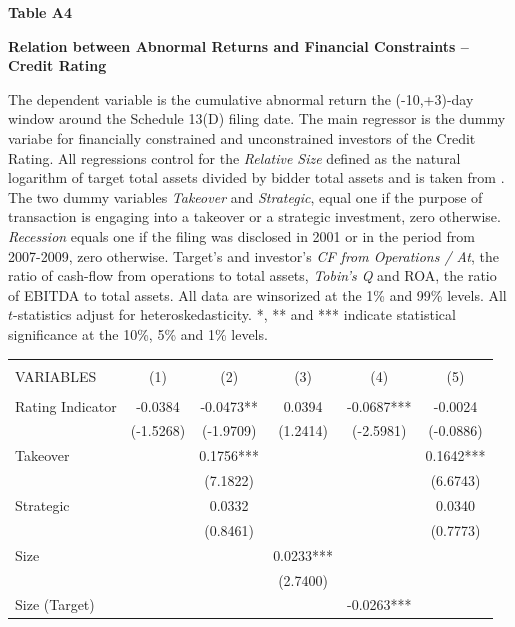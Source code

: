 \documentclass[12pt]{article}
\begin{document}
\begin{appendices}
\begin{table}[!htbp]
	\centering
	\textbf{Table A4}\par\medskip
	\large\textbf{Relation between Abnormal Returns and Financial Constraints -- Credit Rating}\par\medskip
	\justifying
	\footnotesize\noindent{} The dependent variable is the cumulative abnormal return the (-10,+3)-day window around the Schedule 13(D) filing date. The main regressor is the dummy variabe for financially constrained and unconstrained investors of the Credit Rating. All regressions control for the \emph{Relative Size} defined as the natural logarithm of target total assets divided by bidder total assets and is taken from \citet[p.112]{Khatami2014}. The two dummy variables \emph{Takeover} and \emph{Strategic}, equal one if the purpose of transaction is engaging into a takeover or a strategic investment, zero otherwise. \emph{Recession} equals one if the filing was disclosed in 2001 or in the period from 2007-2009, zero otherwise. Target's and investor's \emph{CF from Operations / At}, the ratio of cash-flow from operations to total assets, \emph{Tobin's Q} and ROA, the ratio of EBITDA to total assets. All data are winsorized at the 1\% and 99\% levels. All $t$-statistics adjust for heteroskedasticity. *, ** and *** indicate statistical significance at the 10\%, 5\% and 1\% levels.\par\medskip
	\begin{adjustbox}{max width=\textwidth}
		\begin{tabular}{lccccc} \hline
			\\
		   VARIABLES & (1) & (2) & (3) & (4) & (5) \\ \hline
			&  &  &  &  &  \\
		   Rating Indicator & -0.0384 & -0.0473** & 0.0394 & -0.0687*** & -0.0024 \\
			& (-1.5268) & (-1.9709) & (1.2414) & (-2.5981) & (-0.0886) \\
		   Takeover &  & 0.1756*** &  &  & 0.1642*** \\
			&  & (7.1822) &  &  & (6.6743) \\
		   Strategic &  & 0.0332 &  &  & 0.0340 \\
			&  & (0.8461) &  &  & (0.7773) \\
		   Size &  &  & 0.0233*** &  &  \\
			&  &  & (2.7400) &  &  \\
		   Size (Target) &  &  &  & -0.0263*** &  \\

\end{tabular}
\end{adjustbox}
\end{table}
\end{appendices}
\end{document}
